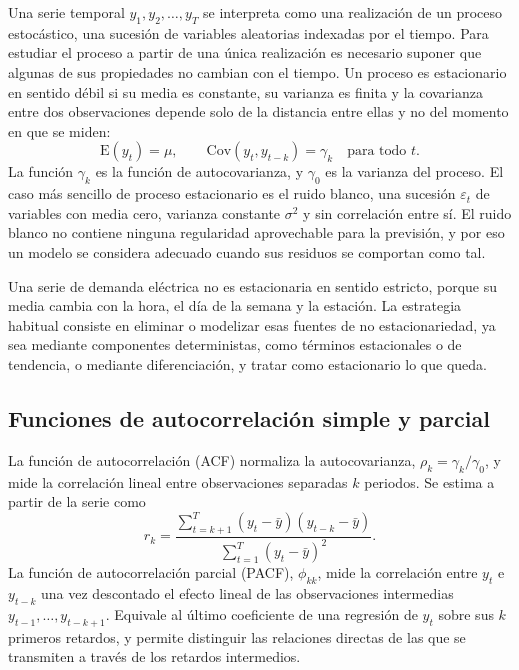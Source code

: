 Una serie temporal $y_1, y_2, \dots, y_T$ se interpreta como una realización
de un proceso estocástico, una sucesión de variables aleatorias indexadas
por el tiempo. Para estudiar el proceso a partir de una única realización es
necesario suponer que algunas de sus propiedades no cambian con el tiempo.
Un proceso es estacionario en sentido débil si su media es constante, su
varianza es finita y la covarianza entre dos observaciones depende solo de
la distancia entre ellas y no del momento en que se miden:
\begin{equation}
	\mathrm{E}(y_t) = \mu, \qquad
	\mathrm{Cov}(y_t, y_{t-k}) = \gamma_k \quad \text{para todo } t.
\end{equation}
La función $\gamma_k$ es la función de autocovarianza, y $\gamma_0$ es la
varianza del proceso. El caso más sencillo de proceso estacionario es el
ruido blanco, una sucesión $\varepsilon_t$ de variables con media cero,
varianza constante $\sigma^2$ y sin correlación entre sí. El ruido blanco no
contiene ninguna regularidad aprovechable para la previsión, y por eso un
modelo se considera adecuado cuando sus residuos se comportan como tal.

Una serie de demanda eléctrica no es estacionaria en sentido estricto, porque
su media cambia con la hora, el día de la semana y la estación. La estrategia
habitual consiste en eliminar o modelizar esas fuentes de no estacionariedad,
ya sea mediante componentes deterministas, como términos estacionales o de
tendencia, o mediante diferenciación, y tratar como estacionario lo que
queda.

\subsection{Funciones de autocorrelación simple y parcial}\label{sec:acf}

La función de autocorrelación (ACF) normaliza la autocovarianza,
$\rho_k = \gamma_k / \gamma_0$, y mide la correlación lineal entre
observaciones separadas $k$ periodos. Se estima a partir de la serie como
\begin{equation}
	r_k = \frac{\sum_{t=k+1}^{T} (y_t - \bar{y})(y_{t-k} - \bar{y})}
	           {\sum_{t=1}^{T} (y_t - \bar{y})^2}.
\end{equation}
La función de autocorrelación parcial (PACF), $\phi_{kk}$, mide la
correlación entre $y_t$ e $y_{t-k}$ una vez descontado el efecto lineal de
las observaciones intermedias $y_{t-1}, \dots, y_{t-k+1}$. Equivale al último
coeficiente de una regresión de $y_t$ sobre sus $k$ primeros retardos, y
permite distinguir las relaciones directas de las que se transmiten a través
de los retardos intermedios.

